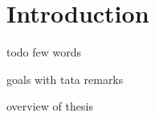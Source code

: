 \chapter{Introduction}
\label{chap:intro}

todo few words

goals with tata remarks


overview of thesis



  
